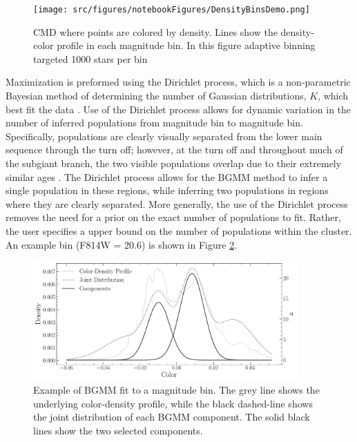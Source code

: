 \begin{figure}
	\centering
	\texttt{[image: src/figures/notebookFigures/DensityBinsDemo.png]}
	\label{fig:densityBinsDemo}
	\caption{CMD where points are colored by density. Lines show the
	density-color profile in each magnitude bin. In this figure adaptive
	binning targeted 1000 stars per bin}
\end{figure}

Maximization is preformed using the Dirichlet process, which is a
non-parametric Bayesian method of determining the number of Gaussian
distributions, $K$, which best fit the data \citep{Ferguson1973, scikit-learn}.
Use of the Dirichlet process allows for dynamic variation in the number of
inferred populations from magnitude bin to magnitude bin. Specifically,
populations are clearly visually separated from the lower main sequence through
the turn off; however, at the turn off and throughout much of the subgiant
branch, the two visible populations overlap due to their extremely similar ages
\citep[i.e.][]{Jordan2002}. The Dirichlet process allows for the BGMM method to
infer a single population in these regions, while inferring two populations in
regions where they are clearly separated. More generally, the use of the
Dirichlet process removes the need for a prior on the exact number of
populations to fit. Rather, the user specifies a upper bound on the number of
populations within the cluster. An example bin (F814W = 20.6) is shown in
Figure \ref{fig:BGMMDist}.

\begin{figure}
	\centering
	\includegraphics[width=0.9\textwidth]{Notebooks/Figures/BGMMMixingBin.pdf}
	\caption{Example of BGMM fit to a magnitude bin. The grey line shows the
	underlying color-density profile, while the black dashed-line shows the
	joint distribution of each BGMM component. The solid black lines show the
	two selected components.}
	\label{fig:BGMMDist}
\end{figure}

